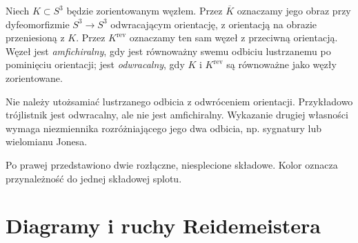 \begin{definicja}
Niech $K\subset S^3$ będzie zorientowanym węzłem.
Przez $\overline K$ oznaczamy jego obraz przy dyfeomorfizmie
$S^3\to S^3$ odwracającym orientację, z orientacją na obrazie
przeniesioną z $K$. Przez $K^{\mathrm{rev}}$ oznaczamy ten sam
węzeł z przeciwną orientacją. Węzeł jest \emph{amfichiralny},
gdy jest równoważny swemu odbiciu lustrzanemu po pominięciu
orientacji; jest \emph{odwracalny}, gdy $K$ i $K^{\mathrm{rev}}$
są równoważne jako węzły zorientowane.
\end{definicja}

\begin{uwaga}
Nie należy utożsamiać lustrzanego odbicia z odwróceniem orientacji.
Przykładowo trójlistnik jest odwracalny, ale nie jest amfichiralny.
Wykazanie drugiej własności wymaga niezmiennika rozróżniającego
jego dwa odbicia, np. sygnatury lub wielomianu Jonesa.
\end{uwaga}


\begin{center}
\end{center}
\noindent Po prawej przedstawiono dwie rozłączne, niesplecione składowe.
Kolor oznacza przynależność do jednej składowej splotu.

\section{Diagramy i ruchy Reidemeistera}
\label{sec:kt-diagramy}

